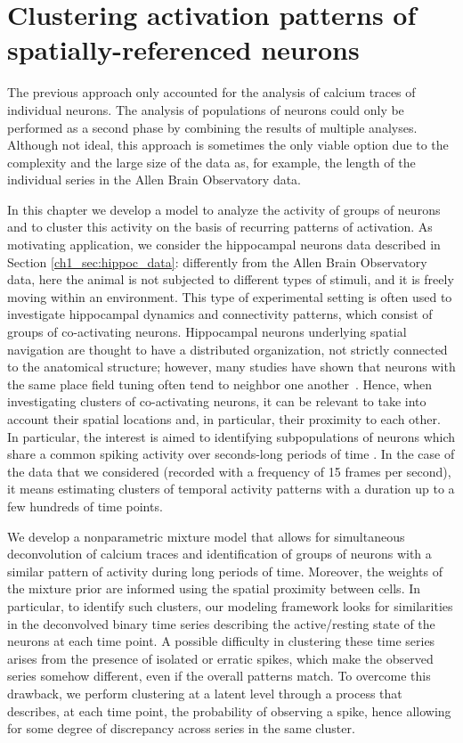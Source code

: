 \chapter{Clustering activation patterns of spatially-referenced neurons}

The previous approach only accounted for the analysis of calcium traces of individual neurons. The analysis of populations of neurons could only be performed as a second phase by combining the results of multiple analyses.
Although not ideal, this approach is sometimes the only viable option due to the complexity and the large size of the data as, for example, the length of the individual series in the Allen Brain Observatory data.

In this chapter we develop a model to analyze the activity of groups of neurons and to cluster this activity on the basis of recurring patterns of activation. As motivating application, we consider the hippocampal neurons data described in Section \ref{ch1_sec:hippoc_data}: differently from the Allen Brain Observatory data, here the animal is not subjected to different types of stimuli, and it is freely moving within an environment.
This type of experimental setting is often used to investigate hippocampal dynamics and connectivity patterns, which consist of groups of co-activating neurons. 
Hippocampal neurons underlying spatial navigation are thought to have a distributed organization, not strictly connected to the anatomical structure; however, many studies have shown that neurons with the same place field tuning often tend to neighbor one another~\parencite{Eichenbaum1989, Redish2001}. Hence, when investigating clusters of co-activating neurons, it can be relevant to take into account their spatial locations and, in particular, their proximity to each other.
In particular, the interest is aimed to identifying subpopulations of neurons which share a common spiking activity over seconds-long periods of time \parencite{Bittner2017}. In the case of the data that we considered (recorded with a frequency of 15 frames per second), it means estimating clusters of temporal activity patterns with a duration up to a few hundreds of time points.

We develop a nonparametric mixture model that allows for simultaneous deconvolution of calcium traces and identification of groups of neurons with a similar pattern of activity during long periods of time. Moreover, the weights of the mixture prior are informed using the spatial proximity between cells. In particular, to identify such clusters, our modeling framework looks for similarities in the deconvolved binary time series describing the active/resting state of the neurons at each time point.
A possible difficulty in clustering these time series arises from the presence of isolated or erratic spikes, which make the observed series somehow different, even if the overall patterns match. To overcome this drawback, we perform clustering at a latent level through a process that describes, at each time point, the probability of observing a spike, hence allowing for some degree of discrepancy across series in the same cluster.



